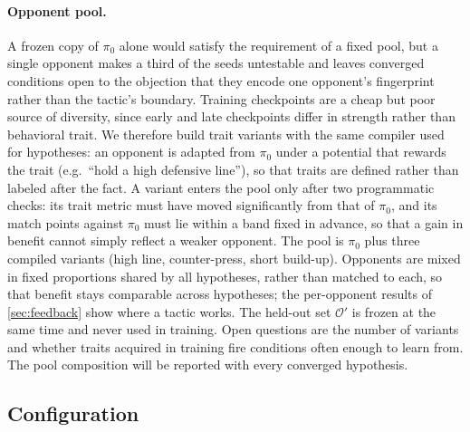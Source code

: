\documentclass[11pt]{article}
\newcommand{\opp}{\mathcal{O}}           %
\begin{document}
\paragraph{Opponent pool.}
A frozen copy of $\pi_0$ alone would satisfy the requirement of a fixed pool, but a single opponent makes a third of the seeds untestable and leaves converged conditions open to the objection that they encode one opponent's fingerprint rather than the tactic's boundary.
Training checkpoints are a cheap but poor source of diversity, since early and late checkpoints differ in strength rather than behavioral trait.
We therefore build trait variants with the same compiler used for hypotheses: an opponent is adapted from $\pi_0$ under a potential that rewards the trait (e.g.\ ``hold a high defensive line''), so that traits are defined rather than labeled after the fact.
A variant enters the pool only after two programmatic checks: its trait metric must have moved significantly from that of $\pi_0$, and its match points against $\pi_0$ must lie within a band fixed in advance, so that a gain in benefit cannot simply reflect a weaker opponent.
The pool is $\pi_0$ plus three compiled variants (high line, counter-press, short build-up).
Opponents are mixed in fixed proportions shared by all hypotheses, rather than matched to each, so that benefit stays comparable across hypotheses; the per-opponent results of \cref{sec:feedback} show where a tactic works.
The held-out set $\opp'$ is frozen at the same time and never used in training.
Open questions are the number of variants and whether traits acquired in training fire conditions often enough to learn from.
The pool composition will be reported with every converged hypothesis.

\subsection{Configuration}
\label{sec:config}
\end{document}
